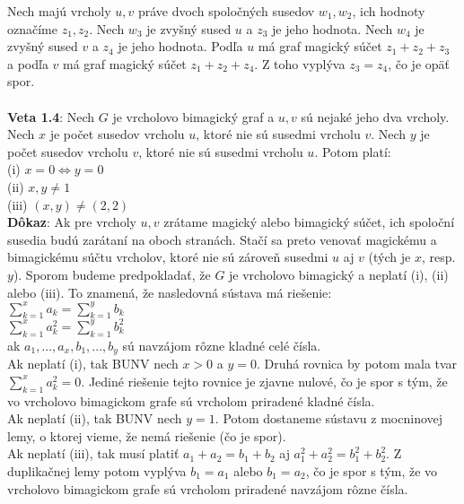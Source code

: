 \documentclass[12pt]{article}
\begin{document}
Nech majú vrcholy $u,v$ práve dvoch spoločných susedov $w_1, w_2$, ich hodnoty označíme $z_1, z_2$. Nech $w_3$ je zvyšný sused $u$ a $z_3$ je jeho hodnota. Nech $w_4$ je zvyšný sused $v$ a $z_4$ je jeho hodnota. Podľa $u$ má graf magický súčet $z_1 + z_2 + z_3$ a podľa $v$ má graf magický súčet $z_1 + z_2 + z_4$. Z toho vyplýva $z_3 = z_4$, čo je opäť spor. \\\\

\textbf{Veta 1.4}: Nech $G$ je vrcholovo bimagický graf a $u,v$ sú nejaké jeho dva vrcholy. Nech $x$ je počet susedov vrcholu $u$, ktoré nie sú susedmi vrcholu $v$. Nech $y$ je počet susedov vrcholu $v$, ktoré nie sú susedmi vrcholu $u$. Potom platí: \\
(i) $x = 0 \iff y = 0$ \\
(ii) $x,y \neq 1$ \\
(iii) $(x,y) \neq (2,2)$ \\

\textbf{Dôkaz}: Ak pre vrcholy $u,v$ zrátame magický alebo bimagický súčet, ich spoloční susedia budú zarátaní na oboch stranách. Stačí sa preto venovať magickému a bimagickému súčtu vrcholov, ktoré nie sú zároveň susedmi $u$ aj $v$ (tých je $x$, resp. $y$). Sporom budeme predpokladať, že $G$ je vrcholovo bimagický a neplatí (i), (ii) alebo (iii). To znamená, že nasledovná sústava má riešenie: \\
$\sum_{k=1}^{x} a_k = \sum_{k=1}^{y} b_k$ \\
$\sum_{k=1}^{x} a^2_k = \sum_{k=1}^{y} b^2_k$ \\
ak $a_1, ... , a_x, b_1, ... , b_y$ sú navzájom rôzne kladné celé čísla. \\

Ak neplatí (i), tak BUNV nech $x > 0$ a $y = 0$. Druhá rovnica by potom mala tvar $\sum_{k=1}^{x} a^2_k = 0$. Jediné riešenie tejto rovnice je zjavne nulové, čo je spor s tým, že vo vrcholovo bimagickom grafe sú vrcholom priradené kladné čísla.  \\

Ak neplatí (ii), tak BUNV nech $y = 1$. Potom dostaneme sústavu z mocninovej lemy, o ktorej vieme, že nemá riešenie (čo je spor). \\

Ak neplatí (iii), tak musí platiť $a_1 + a_2 = b_1 + b_2$ aj $a^2_1 + a^2_2 = b^2_1 + b^2_2$. Z duplikačnej lemy potom vyplýva $b_1 = a_1$ alebo $b_1 = a_2$,  čo je spor s tým, že vo vrcholovo bimagickom grafe sú vrcholom priradené navzájom rôzne čísla. \\\\
\end{document}
